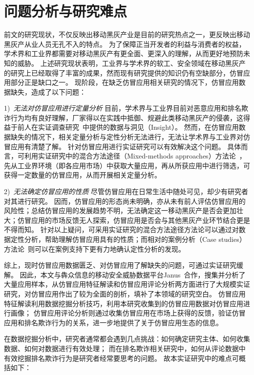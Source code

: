 \section{问题分析与研究难点}

前文的研究现状，不仅反映出移动黑灰产业是目前的研究热点之一，更反映出移动黑灰产从业人员无孔不入的特点。
为了保障正当开发者的利益与消费者的权益，学术界和工业界都需要对移动黑灰产有更全面、更深入的理解，从而更好地预防未知的威胁。
上述研究现状表明，工业界与学术界的软工、安全领域在移动黑灰产的研究上已经取得了丰富的成果，然而现有研究提供的知识仍有空缺部分，仿冒应用部分正是缺口之一。
现阶段，在缺乏仿冒应用相关研究的情况下，仿冒应用数据缺失，造成了以下问题：

1)\	\emph{无法对仿冒应用进行定量分析} \quad
目前，学术界与工业界目前对恶意应用和排名欺诈行为均有良好理解，厂家得以在实践中抵御、规避此类移动黑灰产的侵袭，这得益于前人在实证调查研究~\cite{Felt2011ASO, Zhou2012DissectingAM, zhou2012hey, rahman2019art}中提供的数据与洞见（Insight）。
然而，在仿冒应用数据缺失的情况下，相关定量分析与定性分析无法进行，无法让学术界与工业界对仿冒应用有清楚了解。
针对仿冒应用进行实证研究可以有效解决这个问题。
具体而言，可利用实证研究中的混合方法途径（Mixed-methods approaches）方法论~\cite{easterbrook2008selecting}，先从工业界环境（即各应用市场）中获取大量应用，再从所获应用中进行筛选，可获得一定数量的仿冒应用，从而开展相关定量分析。

2)\	\emph{无法确定仿冒应用的性质} \quad
尽管仿冒应用在日常生活中随处可见，却少有研究者对其进行研究。
因而，仿冒应用的形态尚未明确，亦从未有前人评估仿冒应用的风险性；总结仿冒应用的发展趋势不明，无法确定这一移动黑灰产是否会更加壮大；仿冒应用的市场反馈无人探索，仿冒应用是否会与其他黑灰产业环节结合更是不得而知。
针对以上疑问，可采用实证研究的混合方法途径方法论可以通过对数据定性分析，帮助理解仿冒应用具有的性质；而相对的案例分析（Case studies）方法论~\cite{easterbrook2008selecting}则可以在案例支持下更有力地确认定性分析的发现。

综上，现时仿冒应用数据匮乏、对仿冒应用了解缺失的问题，可通过实证研究缓解。
因此，本文与犇众信息的移动安全威胁数据平台Janus~\cite{janus}合作，搜集并分析了大量应用样本，从仿冒应用特征解读和仿冒应用评论分析两方面进行了大规模实证研究，对仿冒应用作出了较为全面的剖析，填补了本领域的研究空白。
仿冒应用特征解读利用数据挖掘分析技巧，利用本研究收集到的仿冒应用数据对仿冒应用进行画像；
仿冒应用评论分析则通过收集仿冒应用在市场上获得的反馈，验证仿冒应用和排名欺诈行为的关系，进一步地提供了关于仿冒应用生态的信息。

在数据挖掘分析中，研究者通常都会遇到几点挑战：如何确定研究主体、如何收集数据、如何对数据进行有效处理；
而在排名欺诈相关研究中，如何从评论数据中有效挖掘排名欺诈行为是研究者经常要思考的问题。
故本实证研究中的难点可概括如下：

